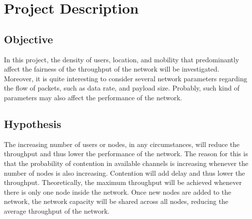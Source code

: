 \chapter{Project Description}

\section{Objective}

In this project, the density of users, location, and mobility that predominantly affect the fairness of the throughput of the network will be investigated. Moreover, it is quite interesting to consider several network parameters regarding the flow of packets, such as data rate, and payload size. Probably, such kind of parameters may also affect the performance of the network.


\section{Hypothesis}

The increasing number of users or nodes, in any circumstances, will reduce the throughput and thus lower the performance of the network. The reason for this is that the probability of contention in available channels is increasing whenever the number of nodes is also increasing. Contention will add delay and thus lower the throughput. Theoretically, the maximum throughput will be achieved whenever there is only one node inside the network. Once new nodes are added to the network, the network capacity will be shared across all nodes, reducing the average throughput of the network.